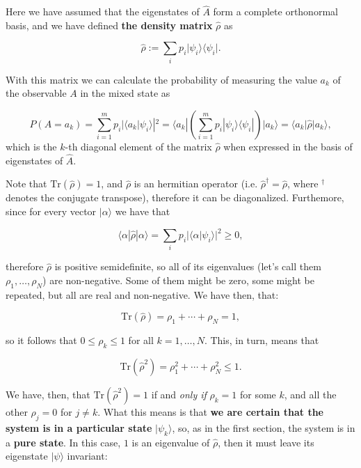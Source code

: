 \documentclass[a4]{article}
\begin{document}
Here we have assumed that the eigenstates of $\hat{A}$ form a complete
orthonormal basis, and we have defined \textbf{the density matrix}
$\hat{\rho}$ as

\begin{equation*}\hat{\rho}:= \sum_i p_i  \vert\psi_i \rangle\langle \psi_i \vert.\end{equation*}

With this matrix we can calculate the probability of measuring the value $a_k$ of the observable
$A$ in the mixed state as

\begin{equation*}
  P(A=a_k) = \sum_{i=1}^m p_i|\langle a_k|\psi_i\rangle|^2 = \langle a_k | \left(\sum_{i=1}^mp_i|\psi_i\rangle\langle\psi_i|\right)|a_k\rangle = \langle a_k |\hat{\rho}|a_k\rangle,
\end{equation*}
which is the $k$-th diagonal element of the matrix $\hat{\rho}$ when expressed in the basis of eigenstates of $\hat{A}$.

Note that $\mathrm{Tr}(\hat{\rho})=1$, and $\hat{\rho}$ is an
hermitian operator (i.e. $\hat{\rho}^{\dagger}=\hat{\rho}$, where $^{\dagger}$ denotes the conjugate transpose), therefore it can be diagonalized. Furthemore, since
for every vector $|\alpha\rangle$ we have that

\begin{equation*}\langle \alpha |\hat{\rho}|\alpha\rangle = \sum_i p_i|\langle\alpha |\psi_i\rangle|^2 \geq 0,\end{equation*}

therefore $\hat{\rho}$ is positive semidefinite, so all of its
eigenvalues (let's call them $\rho_1,\dots,\rho_N$) are non-negative.
Some of them might be zero, some might be repeated, but all are real and
non-negative. We have then, that:

\begin{equation*} \mathrm{Tr}(\hat{\rho}) = \rho_1 + \cdots + \rho_N = 1,\end{equation*}

so it follows that $0\leq\rho_k\leq 1$ for all $k=1,\dots,N$. This,
in turn, means that

\begin{equation*} \mathrm{Tr}\left(\hat{\rho}^2\right) = \rho_1^2 + \cdots + \rho_N^2 \leq 1.\end{equation*}

We have, then, that $\mathrm{Tr}\left(\hat{\rho}^2\right) = 1$ if and
\emph{only if} $\rho_k=1$ for some $k$, and all the other
$\rho_j = 0$ for $j\neq k$. What this means is that \textbf{we are
certain that the system is in a particular state} $|\psi_k\rangle$,
so, as in the first section, the system is in a \textbf{pure state}. In
this case, $1$ is an eigenvalue of $\hat{\rho}$, then it must leave
its eigenstate $|\psi\rangle$ invariant:
\end{document}

